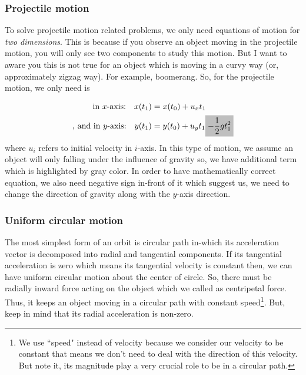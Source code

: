 \documentclass[12pt,a4paper]{article}
\newcommand{\mathcolorbox}[2]{\colorbox{#1}{$\displaystyle #2$}}
\begin{document}
\subsubsection{Projectile motion}

To solve projectile motion related problems, we only need equations of motion for \emph{two dimensions}. This is because if you observe an object moving in the projectile motion, you will only see two components to study this motion. But I want to aware you this is not true for an object which is moving in a curvy way (or, approximately zigzag way). For example, boomerang. So, for the projectile motion, we only need is

\begin{align*}
\text{in $x$-axis:\quad} x(t_{1}) &= x(t_{0}) + u_{x}t_{1} \\
\text{, and in $y$-axis:\quad} y(t_{1}) &= y(t_{0}) + u_{y}t_{1} \mathcolorbox{lightgray}{ - \frac{1}{2}g t^{2}_{1}}
\end{align*}
where $u_{i}$ refers to initial velocity in $i$-axis. In this type of motion, we assume an object will only falling under the influence of gravity so, we have additional term which is highlighted by gray color. In order to have mathematically correct equation, we also need negative sign in-front of it which suggest us, we need to change the direction of gravity along with the $y$-axis direction. 

\subsubsection{Uniform circular motion}

The most simplest form of an orbit is circular path in-which its acceleration vector is decomposed into radial and tangential components. If its tangential acceleration is zero which means its tangential velocity is constant then, we can have uniform circular motion about the center of circle. So, there must be radially inward force acting on the object which we called as centripetal force. Thus, it keeps an object moving in a circular path with constant speed\footnote{We use ``speed" instead of velocity because we consider our velocity to be constant that means we don't need to deal with the direction of this velocity. But note it, its magnitude play a very crucial role to be in a circular path.}. But, keep in mind that its radial acceleration is non-zero. 
\newpage 
\end{document}
